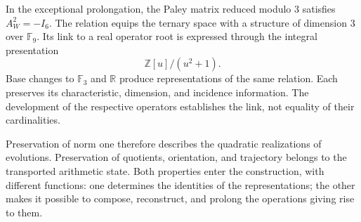 In the exceptional prolongation, the Paley matrix reduced modulo \(3\)
satisfies \(A_W^2=-I_6\). The relation equips the ternary space with a
structure of dimension \(3\) over \(\mathbb F_9\). Its link to a real
operator root is expressed through the integral presentation
\[
 \mathbb Z[u]/(u^2+1).
\]
Base changes to \(\mathbb F_3\) and \(\mathbb R\) produce
representations of the same relation. Each preserves its characteristic,
dimension, and incidence information. The development of the
respective operators establishes the link, not equality of their
cardinalities.

Preservation of norm one therefore describes the quadratic
realizations of evolutions. Preservation of quotients, orientation, and
trajectory belongs to the transported arithmetic state. Both properties
enter the construction, with different functions: one determines the
identities of the representations; the other makes it possible to compose, reconstruct, and
prolong the operations giving rise to them.
